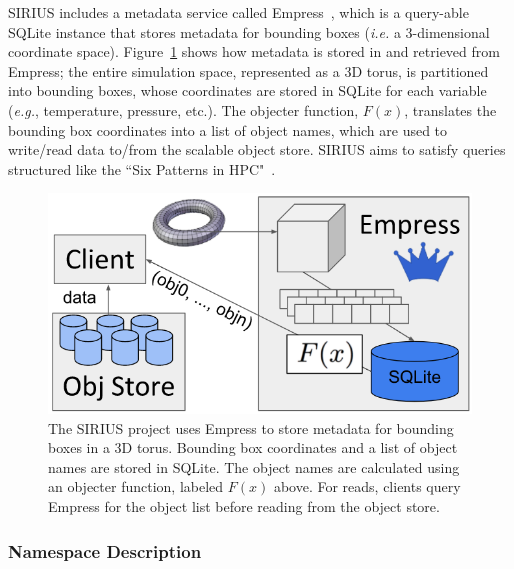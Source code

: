 SIRIUS includes a metadata service called Empress~\cite{lawson:pdsw17-empress},
which is a query-able SQLite instance that stores metadata for bounding boxes
({\it i.e.} a 3-dimensional coordinate space).  Figure~\ref{fig:empress} shows
how metadata is stored in and retrieved from Empress; the entire simulation
space, represented as a 3D torus, is partitioned into bounding boxes, whose
coordinates are stored in SQLite for each variable ({\it e.g.}, temperature,
pressure, etc.).  The objecter function, \(F(x)\), translates the bounding box
coordinates into a list of object names, which are used to write/read data
to/from the scalable object store. SIRIUS aims to satisfy queries structured
like the ``Six Patterns in HPC"~\cite{lofstead:hpdc11-6degrees}. 


\begin{figure}[tb]
\centering
  \includegraphics[width=1\linewidth]{figures/empress.png}
  \caption{The SIRIUS project uses Empress to store metadata for bounding boxes
in a 3D torus. Bounding box coordinates and a list of object names are stored
in SQLite. The object names are calculated using an objecter function, labeled
\(F(x)\) above. For reads, clients query Empress for the object list before
reading from the object store.}
  \label{fig:empress}
\end{figure}

\subsubsection{Namespace Description}

